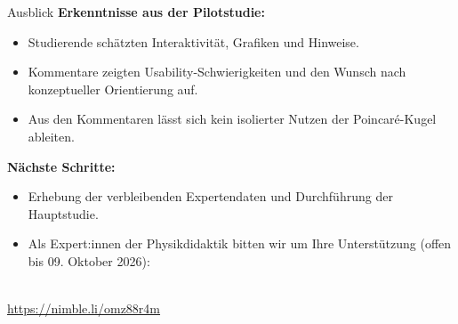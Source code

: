 \begin{frame}{Ausblick}
\vspace{-0.4em}
\textbf{Erkenntnisse aus der Pilotstudie:} 
\begin{itemize}\setlength{\itemsep}{1pt}
    \item Studierende schätzten Interaktivität, Grafiken und Hinweise.
    \item Kommentare zeigten Usability-Schwierigkeiten und den Wunsch nach konzeptueller Orientierung auf.
    \item Aus den Kommentaren lässt sich kein isolierter Nutzen der Poincaré-Kugel ableiten.
\end{itemize}
\textbf{Nächste Schritte:} 
\begin{itemize}\setlength{\itemsep}{1pt}
    \item Erhebung der verbleibenden Expertendaten und Durchführung der Hauptstudie.
    \item Als Expert:innen der Physikdidaktik bitten wir um Ihre Unterstützung (offen bis 09. Oktober 2026): 
\end{itemize}
\centering
{} \\[1mm]
{\small\url{https://nimble.li/omz88r4m}}
\end{frame}
